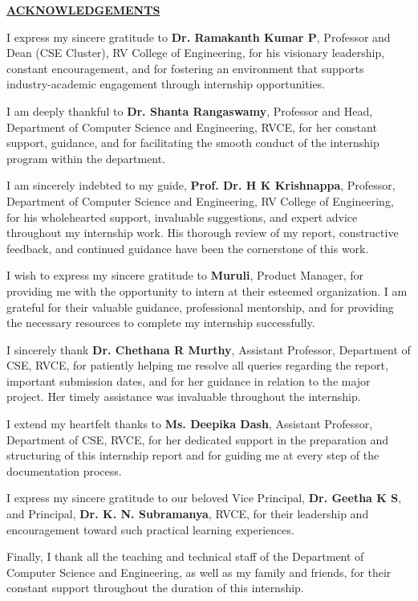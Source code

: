 \thispagestyle{empty}
\begin{center}
	\Large\textbf{\underline{ACKNOWLEDGEMENTS}} \par
\end{center}

I express my sincere gratitude to \textbf{Dr. Ramakanth Kumar P}, Professor and Dean (CSE Cluster), RV College of Engineering, for his visionary leadership, constant encouragement, and for fostering an environment that supports industry-academic engagement through internship opportunities.

I am deeply thankful to \textbf{Dr. Shanta Rangaswamy}, Professor and Head, Department of Computer Science and Engineering, RVCE, for her constant support, guidance, and for facilitating the smooth conduct of the internship program within the department.

I am sincerely indebted to my guide, \textbf{Prof. Dr. H K Krishnappa}, Professor, Department of Computer Science and Engineering, RV College of Engineering, for his wholehearted support, invaluable suggestions, and expert advice throughout my internship work. His thorough review of my report, constructive feedback, and continued guidance have been the cornerstone of this work.

I wish to express my sincere gratitude to \textbf{Muruli}, Product Manager,  for providing me with the opportunity to intern at their esteemed organization. I am grateful for their valuable guidance, professional mentorship, and for providing the necessary resources to complete my internship successfully.

I sincerely thank \textbf{Dr. Chethana R Murthy}, Assistant Professor, Department of CSE, RVCE, for patiently helping me resolve all queries regarding the report, important submission dates, and for her guidance in relation to the major project. Her timely assistance was invaluable throughout the internship.

I extend my heartfelt thanks to \textbf{Ms. Deepika Dash}, Assistant Professor, Department of CSE, RVCE, for her dedicated support in the preparation and structuring of this internship report and for guiding me at every step of the documentation process.

I express my sincere gratitude to our beloved Vice Principal, \textbf{Dr. Geetha K S}, and Principal, \textbf{Dr. K. N. Subramanya}, RVCE, for their leadership and encouragement toward such practical learning experiences.

Finally, I thank all the teaching and technical staff of the Department of Computer Science and Engineering, as well as my family and friends, for their constant support throughout the duration of this internship.